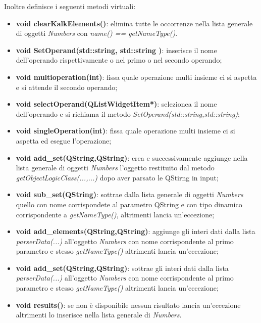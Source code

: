 \documentclass[a4paper,10pt]{article}
\begin{document}
            Inoltre definisce i seguenti metodi virtuali:
            \begin{itemize}
                \item \textbf{void clearKalkElements()}: elimina tutte le occorrenze nella lista generale di oggetti \textit{Numbers} con \textit{name() == getNameType()}.
                \item \textbf{void SetOperand(std::string, std::string )}: inserisce il nome dell'operando rispettivamente o nel primo o nel secondo operando;
                \item \textbf{void multioperation(int)}: fissa quale operazione multi insieme ci si aspetta e si attende il secondo operando;
                \item \textbf{void selectOperand(QListWidgetItem*)}: selezionea il nome dell'operando e si richiama il metodo \textit{SetOperand(std::string,std::string)};
                \item \textbf{void singleOperation(int)}: fissa quale operazione multi insieme ci si aspetta ed esegue l'operazione;
                \item \textbf{void add\_set(QString,QString)}: crea e successivamente aggiunge nella lista generale di oggetti \textit{Numbers} l'oggetto restituito dal metodo \textit{getObjectLogicClass(...,...)} dopo aver parsato le QStirng in input;
                \item \textbf{void sub\_set(QString)}: sottrae dalla lista generale di oggetti \textit{Numbers} quello con nome corrispondete al parametro QString e con tipo dinamico corrispondente a \textit{getNameType()}, altrimenti lancia un'eccezione;
                \item \textbf{void add\_elements(QString,QString)}: aggiunge gli interi dati dalla lista \textit{parserData(...)} all'oggetto \textit{Numbers} con nome corrispondente al primo parametro e stesso \textit{getNameType()} altrimenti lancia un'eccezione;
                \item \textbf{void add\_set(QString,QString)}: sottrae gli interi dati dalla lista \textit{parserData(...)} all'oggetto \textit{Numbers} con nome corrispondente al primo parametro e stesso \textit{getNameType()} altrimenti lancia un'eccezione;
                \item \textbf{void results()}: se non è disponibile nessun risultato lancia un'eccezione altrimenti lo inserisce nella lista generale di \textit{Numbers}.
            \end{itemize}
    
\end{document}
